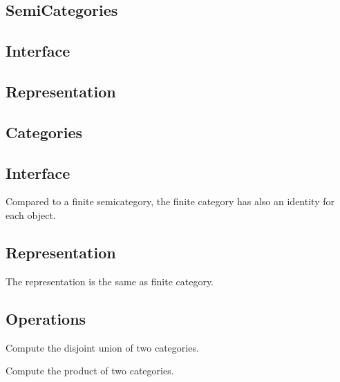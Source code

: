 
\subsection{SemiCategories}
\subsection*{Interface}

\subsection*{Representation}

\subsection{Categories}
\subsection*{Interface}
Compared to a finite semicategory, the finite category has also an identity for each object.

\subsection*{Representation}

The representation is the same as finite category.

\subsection*{Operations}

\begin{codeexercise}
	Compute the disjoint union of two categories.

\end{codeexercise}

\begin{codeexercise}
	Compute the product of two categories.

\end{codeexercise}


